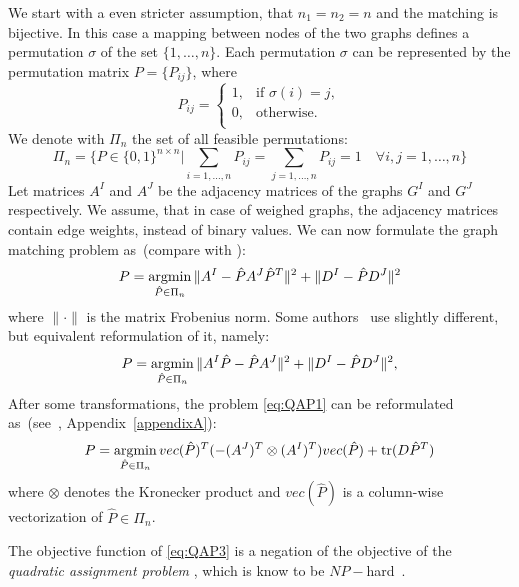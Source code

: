 We start with a even stricter assumption, that $n_1=n_2=n$ and the matching is bijective. In this case a mapping between nodes of the two graphs defines a permutation $\sigma$ of the set $\{1,\dots,n\}$. Each permutation $\sigma$ can be represented by the permutation matrix $P=\{P_{ij}\}$, where
\begin{equation*}
P_{ij}=\begin{cases}
 1, & \text{if } \sigma(i)=j, \\
 0, & \text{otherwise.} \\
\end{cases}
\end{equation*}
We denote with $\Pi_n$ the set of all feasible permutations:
\begin{equation*}
\Pi_n=\{P\in\{0,1\}^{n\times n}|\sum_{i=1,\dots,n}P_{ij}=\sum_{j=1,\dots,n}P_{ij}=1\quad\forall i,j=1,\dots,n\}
\end{equation*}
Let matrices $A^I$ and $A^J$ be the adjacency matrices of the graphs $G^I$ and $G^J$ respectively. We assume, that in case of weighed graphs, the adjacency matrices contain edge weights, instead of binary values. We can now formulate the graph matching problem as~(compare with \cite{FastPFP,Roth2001}):
\begin{equation} \label{eq:QAP1}
P = \mathop{\rm argmin}_{\hat{P}\in\Pi_n}\|A^I-\hat{P}A^J\hat{P}^T\|^2+\|D^I-\hat{P}D^J\|^2
\end{equation}
where $\|\cdot\|$ is the matrix Frobenius norm. Some authors~\cite{Vogelstein_BrainGraphs} use slightly different, but equivalent reformulation of it, namely:
\begin{equation} \label{eq:QAP2}
P = \mathop{\rm argmin}_{\hat{P}\in\Pi_n}\|A^I\hat{P}-\hat{P}A^J\|^2+\|D^I-\hat{P}D^J\|^2,
\end{equation}
After some transformations, the problem \eqref{eq:QAP1} can be reformulated as~(see~\cite{Burkard98thequadratic}, Appendix~\ref{appendixA}):
\begin{equation} \label{eq:QAP3}
P = \mathop{\rm argmin}_{\hat{P}\in\Pi_n}vec(\hat{P})^T(-(A^J)^T\otimes(A^I)^T)vec(\hat{P})+\mathop{\rm tr}(D\hat{P}^T)
\end{equation}
where $\otimes$ denotes the Kronecker product and $vec(\hat{P})$ is a column-wise vectorization of $\hat{P}\in\Pi_n$.

The objective function of \eqref{eq:QAP3} is a negation of the objective of the \emph{quadratic assignment problem}%
, which is know to be $NP-$hard~\cite{Burkard98thequadratic,Sahni1974}.

